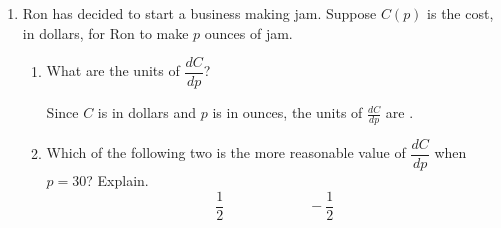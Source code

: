 \documentclass{article}
\newcommand{\goal}[1]{\textbf{\textcolor{skyblue}{#1}}}
\theoremstyle{theorem}
\begin{document}
\begin{enumerate}
\begin{enumerate}
  \item
    \begin{problem}[\nstretch{0.8}]
      Find the total time Tim travels as a function of $x$.
    \end{problem}

    \begin{solution}

      \hl{\textbf{Goal:}} Express \goal{total time $T$} in terms of $x$.

      Using the picture from the previous part, 
      \begin{align*}
        \goal{$T$} &= \text{time to swim $d_1$} + \text{time to swim $d_2$} \\
        \intertext{Since $\text{distance} = \text{rate} \cdot \text{time}$, $\text{time} = \dfrac{\text{distance}}{\text{rate}}$, so we can rewrite our formula for \goal{$T$} as:}
        &= \dfrac{d_1}{\text{swimming speed without tree}} + \dfrac{d_2}{\text{swimming speed with tree}} \\
        \intertext{Since $d_1, d_2$ are in meters, we need to express the speeds in meters per hour:} %
        &= \boxed{\frac{\sqrt{100^2+x^2}}{8000}+\frac{\sqrt{50^2 + (500-x)^2}}{4000}}  \text{ hours}
      \end{align*}
    \end{solution}

  \end{enumerate}

\item \label{fall2015-1a-m2practice4-4}  

  Ron has decided to start a business making jam.  Suppose $C(p)$ is the
  cost, in dollars, for Ron to make $p$ ounces of jam.

  \begin{enumerate}
  \item
    \begin{problem}[\vfill]
      What are the units of $\dfrac{dC}{dp}$?  
    \end{problem}

    \begin{solution} %
      Since $C$ is in dollars and $p$ is in ounces, the units of $\frac{dC}{dp}$ are .
    \end{solution}

  \item \label{interpret-derivative-ron-jam-choose}
    \begin{problem}[\vfill]
      Which of the following two is the more reasonable value of $\dfrac{dC}{dp}$ when $p = 30$? Explain.
      \[ \frac{1}{2} \hspace{1in} -\frac{1}{2}\]
    \end{problem}


\end{enumerate}
\end{enumerate}
\end{document}
